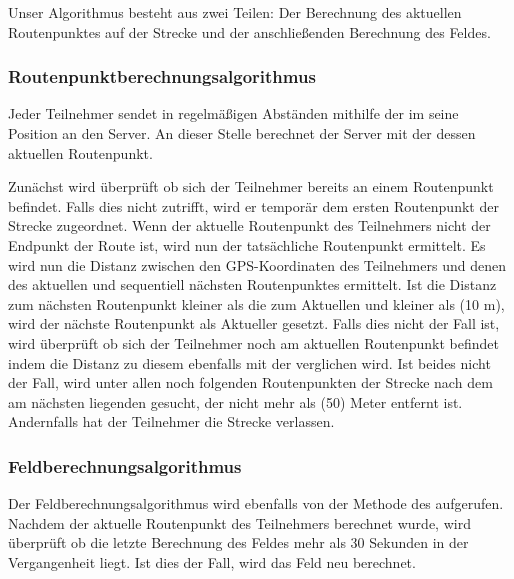 Unser Algorithmus besteht aus zwei Teilen: Der Berechnung des aktuellen Routenpunktes auf der Strecke und der anschließenden Berechnung des Feldes.

\subsubsection{Routenpunktberechnungsalgorithmus}
\label{subsubsec:Routenpunktberechnungsalgorithmus}
Jeder Teilnehmer sendet in regelmäßigen Abständen mithilfe der  im  seine Position an den Server. An dieser Stelle berechnet der Server mit der  dessen aktuellen Routenpunkt.

Zunächst wird überprüft ob sich der Teilnehmer bereits an einem Routenpunkt befindet. Falls dies nicht zutrifft, wird er temporär dem ersten Routenpunkt der Strecke zugeordnet. Wenn der aktuelle Routenpunkt des Teilnehmers nicht der Endpunkt der Route ist, wird nun der tatsächliche Routenpunkt ermittelt. Es wird nun die Distanz zwischen den GPS-Koordinaten des Teilnehmers und denen des aktuellen und sequentiell nächsten Routenpunktes ermittelt. Ist die Distanz zum nächsten Routenpunkt kleiner als die zum Aktuellen und kleiner als  (10 m), wird der nächste Routenpunkt als Aktueller gesetzt. Falls dies nicht der Fall ist, wird überprüft ob sich der Teilnehmer noch am aktuellen Routenpunkt befindet indem die Distanz zu diesem ebenfalls mit der  verglichen wird. Ist beides nicht der Fall, wird unter allen noch folgenden Routenpunkten der Strecke nach dem am nächsten liegenden gesucht, der nicht mehr als  (50) Meter entfernt ist. Andernfalls hat der Teilnehmer die Strecke verlassen.

\subsubsection{Feldberechnungsalgorithmus}
Der Feldberechnungsalgorithmus wird ebenfalls von der  Methode des  aufgerufen. Nachdem der aktuelle Routenpunkt des Teilnehmers berechnet wurde, wird überprüft ob die letzte Berechnung des Feldes mehr als 30 Sekunden in der Vergangenheit liegt. Ist dies der Fall, wird das Feld neu berechnet.

